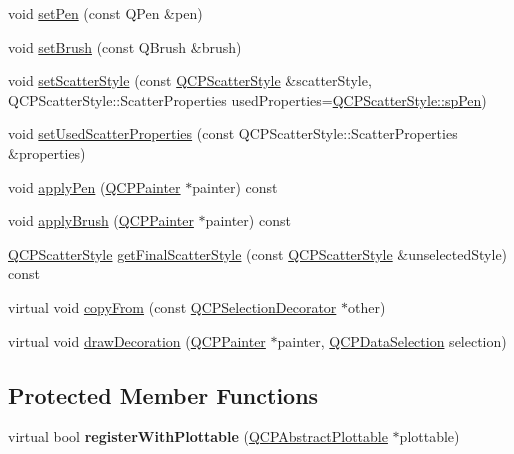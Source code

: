 \begin{DoxyCompactItemize}
\item 
void \hyperlink{classQCPSelectionDecorator_ac2c8192e1e294aa3a4a7f32a859e3d76}{set\+Pen} (const Q\+Pen \&pen)
\item 
void \hyperlink{classQCPSelectionDecorator_aa74b626be518ea17055f918d423c8c2d}{set\+Brush} (const Q\+Brush \&brush)
\item 
void \hyperlink{classQCPSelectionDecorator_ab403a613289714ff4fd4a0c0371ab116}{set\+Scatter\+Style} (const \hyperlink{classQCPScatterStyle}{Q\+C\+P\+Scatter\+Style} \&scatter\+Style, Q\+C\+P\+Scatter\+Style\+::\+Scatter\+Properties used\+Properties=\hyperlink{classQCPScatterStyle_a8974f6a20f8f6eea7781f0e6af9deb46aa04d012e7c03e455db2b68fdd55c2a04}{Q\+C\+P\+Scatter\+Style\+::sp\+Pen})
\item 
void \hyperlink{classQCPSelectionDecorator_a808c1607cd4e83869c04986e332455c0}{set\+Used\+Scatter\+Properties} (const Q\+C\+P\+Scatter\+Style\+::\+Scatter\+Properties \&properties)
\item 
void \hyperlink{classQCPSelectionDecorator_a9a0e62f544971034fec60e62748768b8}{apply\+Pen} (\hyperlink{classQCPPainter}{Q\+C\+P\+Painter} $\ast$painter) const 
\item 
void \hyperlink{classQCPSelectionDecorator_aa7ecaa5c307cc65285cdf62364c69e56}{apply\+Brush} (\hyperlink{classQCPPainter}{Q\+C\+P\+Painter} $\ast$painter) const 
\item 
\hyperlink{classQCPScatterStyle}{Q\+C\+P\+Scatter\+Style} \hyperlink{classQCPSelectionDecorator_aa0c630c41103809985f41b3b81b0c308}{get\+Final\+Scatter\+Style} (const \hyperlink{classQCPScatterStyle}{Q\+C\+P\+Scatter\+Style} \&unselected\+Style) const 
\item 
virtual void \hyperlink{classQCPSelectionDecorator_a467a8d5cfcab27e862a17c797ac27b8a}{copy\+From} (const \hyperlink{classQCPSelectionDecorator}{Q\+C\+P\+Selection\+Decorator} $\ast$other)
\item 
virtual void \hyperlink{classQCPSelectionDecorator_a4f8eb49e277063845391e803ae23054a}{draw\+Decoration} (\hyperlink{classQCPPainter}{Q\+C\+P\+Painter} $\ast$painter, \hyperlink{classQCPDataSelection}{Q\+C\+P\+Data\+Selection} selection)
\end{DoxyCompactItemize}
\subsection*{Protected Member Functions}
\begin{DoxyCompactItemize}
\item 
virtual bool {\bfseries register\+With\+Plottable} (\hyperlink{classQCPAbstractPlottable}{Q\+C\+P\+Abstract\+Plottable} $\ast$plottable)\hypertarget{classQCPSelectionDecorator_af66cb39e308da0285ae5d533e1e85027}{}\label{classQCPSelectionDecorator_af66cb39e308da0285ae5d533e1e85027}

\end{DoxyCompactItemize}
